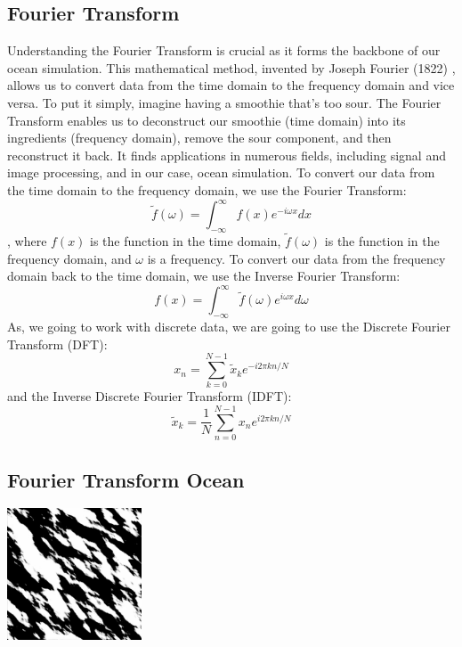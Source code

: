 \subsection{Fourier Transform}
Understanding the Fourier Transform is crucial as it forms the backbone of our ocean simulation. This mathematical method, invented by Joseph Fourier (1822) \cite{fourier1822}, allows us to convert data from the time domain to the frequency domain and vice versa. To put it simply, imagine having a smoothie that’s too sour. The Fourier Transform enables us to deconstruct our smoothie (time domain) into its ingredients (frequency domain), remove the sour component, and then reconstruct it back. It finds applications in numerous fields, including signal and image processing, and in our case, ocean simulation. To convert our data from the time domain to the frequency domain, we use the Fourier Transform:
\begin{equation}
\tilde{f}(\omega) = \int_{-\infty}^{\infty} f(x) e^{-i \omega x} dx
\end{equation}
, where $f(x)$ is the function in the time domain, $\tilde{f}(\omega)$ is the function in the frequency domain, and $\omega$ is a frequency.
To convert our data from the frequency domain back to the time domain, we use the Inverse Fourier Transform:
\begin{equation}
f(x) = \int_{-\infty}^{\infty} \tilde{f}(\omega) e^{i \omega x} d\omega
\end{equation}
As, we going to work with discrete data, we are going to use the Discrete Fourier Transform (DFT):
\begin{equation}
    x_n = \sum_{k=0}^{N-1} \tilde{x}_k e^{-i 2 \pi k n / N}
\end{equation}
and the Inverse Discrete Fourier Transform (IDFT):
\begin{equation}
    \tilde{x}_k = \frac{1}{N} \sum_{n=0}^{N-1} x_n e^{i 2 \pi k n / N}
    \label{eq:idft}
\end{equation}

\subsection{Fourier Transform Ocean}

\begin{minipage}{1\textwidth}
    \centering
    \includegraphics[width=0.3\textwidth]{"images/philips_height_map.png"}
    \label{fig:tessendorf_height}
\end{minipage}

